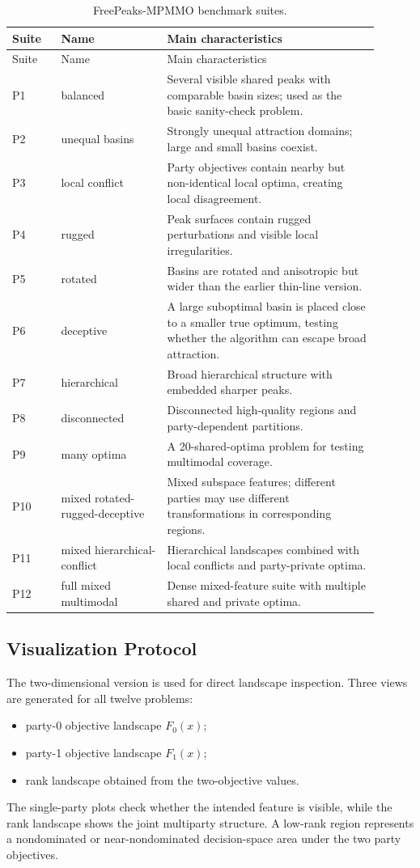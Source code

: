 \documentclass[12pt,a4paper]{article}
\begin{document}
\begin{longtable}{p{0.12\linewidth}p{0.26\linewidth}p{0.52\linewidth}}
\caption{FreePeaks-MPMMO benchmark suites.}\\
\toprule
Suite & Name & Main characteristics \\
\midrule
\endfirsthead
\toprule
Suite & Name & Main characteristics \\
\midrule
\endhead
P1 & balanced & Several visible shared peaks with comparable basin sizes; used as the basic sanity-check problem.\\
P2 & unequal basins & Strongly unequal attraction domains; large and small basins coexist.\\
P3 & local conflict & Party objectives contain nearby but non-identical local optima, creating local disagreement.\\
P4 & rugged & Peak surfaces contain rugged perturbations and visible local irregularities.\\
P5 & rotated & Basins are rotated and anisotropic but wider than the earlier thin-line version.\\
P6 & deceptive & A large suboptimal basin is placed close to a smaller true optimum, testing whether the algorithm can escape broad attraction.\\
P7 & hierarchical & Broad hierarchical structure with embedded sharper peaks.\\
P8 & disconnected & Disconnected high-quality regions and party-dependent partitions.\\
P9 & many optima & A 20-shared-optima problem for testing multimodal coverage.\\
P10 & mixed rotated-rugged-deceptive & Mixed subspace features; different parties may use different transformations in corresponding regions.\\
P11 & mixed hierarchical-conflict & Hierarchical landscapes combined with local conflicts and party-private optima.\\
P12 & full mixed multimodal & Dense mixed-feature suite with multiple shared and private optima.\\
\bottomrule
\end{longtable}

\subsection{Visualization Protocol}

The two-dimensional version is used for direct landscape inspection. Three views are
generated for all twelve problems:
\begin{itemize}[leftmargin=2em]
  \item party-0 objective landscape $F_0(x)$;
  \item party-1 objective landscape $F_1(x)$;
  \item rank landscape obtained from the two-objective values.
\end{itemize}
The single-party plots check whether the intended feature is visible, while the rank
landscape shows the joint multiparty structure. A low-rank region represents a
nondominated or near-nondominated decision-space area under the two party objectives.
\end{document}
